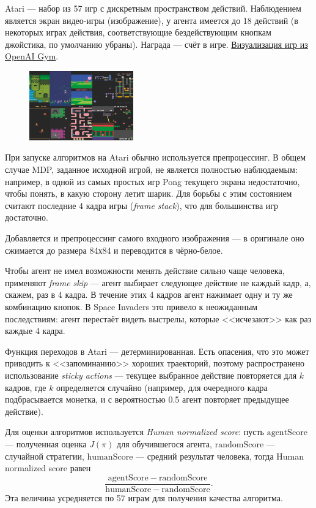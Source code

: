 \begin{example}
Atari --- набор из 57 игр с дискретным пространством действий. Наблюдением является экран видео-игры (изображение), у агента имеется до 18 действий (в некоторых играх действия, соответствующие бездействующим кнопкам джойстика, по умолчанию убраны). Награда --- счёт в игре. \href{https://gym.openai.com/envs/#atari}{Визуализация игр из OpenAI Gym}.

\begin{figure}
\centering
\vspace{-0.3cm}
\includegraphics[width=0.4\textwidth]{Images/Atari.png}
\vspace{-0.8cm}
\end{figure}

При запуске алгоритмов на Atari обычно используется препроцессинг. В общем случае MDP, заданное исходной игрой, не является полностью наблюдаемым: например, в одной из самых простых игр Pong текущего экрана недостаточно, чтобы понять, в какую сторону летит шарик. Для борьбы с этим состоянием считают последние 4 кадра игры (\emph{frame stack}), что для большинства игр достаточно.

Добавляется и препроцессинг самого входного изображения --- в оригинале оно сжимается до размера 84х84 и переводится в чёрно-белое.

Чтобы агент не имел возможности менять действие сильно чаще человека, применяют \emph{frame skip} --- агент выбирает следующее действие не каждый кадр, а, скажем, раз в 4 кадра. В течение этих 4 кадров агент нажимает одну и ту же комбинацию кнопок. В Space Invaders это привело к неожиданным последствиям: агент перестаёт видеть выстрелы, которые <<исчезают>> как раз каждые 4 кадра.

Функция переходов в Atari --- детерминированная. Есть опасения, что это может приводить к <<запоминанию>> хороших траекторий, поэтому распространено использование \emph{sticky actions} --- текущее выбранное действие повторяется для $k$ кадров, где $k$ определяется случайно (например, для очередного кадра подбрасывается монетка, и с вероятностью 0.5 агент повторяет предыдущее действие).

Для оценки алгоритмов используется \emph{Human normalized score}: пусть $\mathrm{agentScore}$ --- полученная оценка $J(\pi)$ для обучившегося агента, $\mathrm{randomScore}$ --- случайной стратегии, $\mathrm{humanScore}$ --- средний результат человека, тогда Human normalized score равен
$$\frac{\mathrm{agentScore} - \mathrm{randomScore}}{\mathrm{humanScore} - \mathrm{randomScore}}.$$
Эта величина усредняется по 57 играм для получения качества алгоритма.
\end{example}

